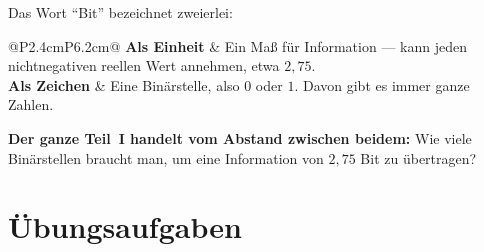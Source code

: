 \begin{warnung}
Das Wort \enquote{Bit} bezeichnet zweierlei:

\begin{center}
{\small
\renewcommand{\arraystretch}{1.5}
\begin{tabular}{@{}P{2.4cm}P{6.2cm}@{}}
\toprule
\textbf{Als Einheit} & Ein Maß für Information --- kann jeden nichtnegativen reellen Wert annehmen, etwa $2{,}75$.\\
\textbf{Als Zeichen} & Eine Binärstelle, also $0$ oder $1$. Davon gibt es immer ganze Zahlen.\\
\bottomrule
\end{tabular}}
\end{center}

\begin{center}
\begin{minipage}{0.9\textwidth}
\textbf{Der ganze Teil~I handelt vom Abstand zwischen beidem:} Wie viele Binärstellen braucht man, um eine Information von $2{,}75$ Bit zu übertragen?
\end{minipage}
\end{center}

\begin{center}
\begin{minipage}{0.88\textwidth}
\end{minipage}
\end{center}
\end{warnung}

\section{Übungsaufgaben}

